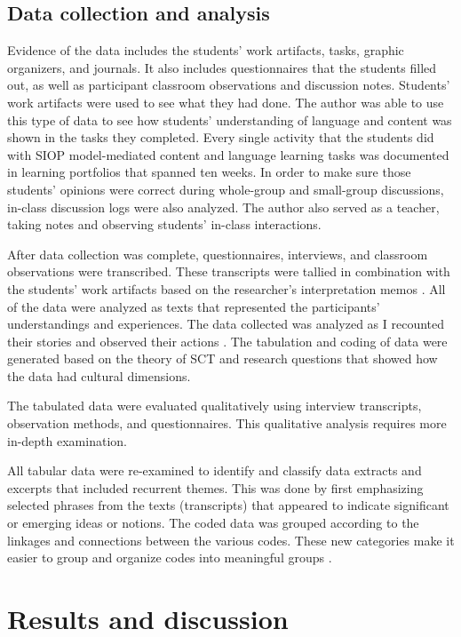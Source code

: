 \documentclass[english]{textolivre}
\begin{document}
\subsection{Data collection and analysis}\label{sec-modelo}
Evidence of the data includes the students' work artifacts, tasks, graphic organizers, and journals. It also includes questionnaires that the students filled out, as well as participant classroom observations and discussion notes. Students' work artifacts were used to see what they had done. The author was able to use this type of data to see how students' understanding of language and content was shown in the tasks they completed. Every single activity that the students did with SIOP model-mediated content and language learning tasks was documented in learning portfolios that spanned ten weeks. In order to make sure those students' opinions were correct during whole-group and small-group discussions, in-class discussion logs were also analyzed. The author also served as a teacher, taking notes and observing students' in-class interactions.

After data collection was complete, questionnaires, interviews, and classroom observations were transcribed. These transcripts were tallied in combination with the students' work artifacts based on the researcher's interpretation memos \cite{kusumaningputri_promoting_2018}. All of the data were analyzed as texts that represented the participants' understandings and experiences. The data collected was analyzed as I recounted their stories and observed their actions \cite{widodo_methodological_2014}. The tabulation and coding of data were generated based on  the theory of SCT and research questions that showed how the data had  cultural dimensions.

The tabulated data were evaluated qualitatively using interview transcripts, observation methods, and questionnaires. This qualitative analysis requires more in-depth examination.

All tabular data were re-examined to identify and classify data extracts and excerpts that included recurrent themes. This was done by first emphasizing selected phrases from the texts (transcripts) that appeared to indicate significant or emerging ideas or notions. The coded data was grouped according to the linkages and connections between the various codes. These new categories make it easier to group and organize codes into meaningful groups \cite{kusumaningputri_promoting_2018}.

\section{Results and discussion}\label{sec-organizacao}
\end{document}
